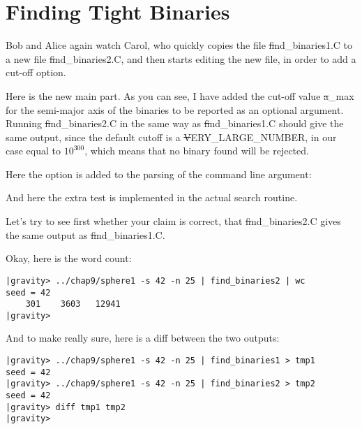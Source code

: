 \cba

\section{Finding Tight Binaries}

Bob and Alice again watch Carol, who quickly copies the file
{\st find\_binaries1.C} to a new file {\st find\_binaries2.C},
and then starts editing the new file, in order to add a cut-off
option.

\abc

\carol
Here is the new main part.  As you can see, I have added the cut-off
value {\st a\_max} for the semi-major axis of the binaries to be
reported as an optional argument.  Running {\st find\_binaries2.C} in
the same way as {\st find\_binaries1.C} should give the same output,
since the default cutoff is a {\st VERY\_LARGE\_NUMBER}, in our case
equal to $10^{300}$, which means that no binary found will be rejected.

\cba


Here the option is added to the parsing of the command line argument:


And here the extra test is implemented in the actual search routine.


\abc

\bob
Let's try to see first whether your claim is correct, that 
{\st find\_binaries2.C} gives the same output as {\st
find\_binaries1.C}.

\carol
Okay, here is the word count:

\cba

\begin{small}
\begin{verbatim}
|gravity> ../chap9/sphere1 -s 42 -n 25 | find_binaries2 | wc
seed = 42
    301    3603   12941
|gravity> 
\end{verbatim}
\end{small}

\abc

\carol
And to make really sure, here is a diff between the two outputs:

\cba

\begin{small}
\begin{verbatim}
|gravity> ../chap9/sphere1 -s 42 -n 25 | find_binaries1 > tmp1
seed = 42
|gravity> ../chap9/sphere1 -s 42 -n 25 | find_binaries2 > tmp2
seed = 42
|gravity> diff tmp1 tmp2
|gravity> 
\end{verbatim}
\end{small}

